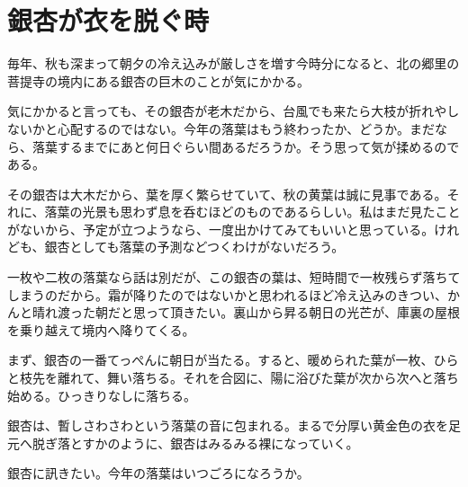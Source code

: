 \section{銀杏が衣を脱ぐ時}

毎年、秋も深まって朝夕の冷え込みが厳しさを増す今時分になると、北の郷里の菩提寺の境内にある銀杏の巨木のことが気にかかる。

気にかかると言っても、その銀杏が老木だから、台風でも来たら大枝が折れやしないかと心配するのではない。今年の落葉はもう終わったか、どうか。まだなら、落葉するまでにあと何日ぐらい間あるだろうか。そう思って気が揉めるのである。

その銀杏は大木だから、葉を厚く繁らせていて、秋の黄葉は誠に見事である。それに、落葉の光景も思わず息を呑むほどのものであるらしい。私はまだ見たことがないから、予定が立つようなら、一度出かけてみてもいいと思っている。けれども、銀杏としても落葉の予測などつくわけがないだろう。

一枚や二枚の落葉なら話は別だが、この銀杏の葉は、短時間で一枚残らず落ちてしまうのだから。霜が降りたのではないかと思われるほど冷え込みのきつい、かんと晴れ渡った朝だと思って頂きたい。裏山から昇る朝日の光芒が、庫裏の屋根を乗り越えて境内へ降りてくる。

まず、銀杏の一番てっぺんに朝日が当たる。すると、暖められた葉が一枚、ひらと枝先を離れて、舞い落ちる。それを合図に、陽に浴びた葉が次から次へと落ち始める。ひっきりなしに落ちる。

銀杏は、暫しさわさわという落葉の音に包まれる。まるで分厚い黄金色の衣を足元へ脱ぎ落とすかのように、銀杏はみるみる裸になっていく。

銀杏に訊きたい。今年の落葉はいつごろになろうか。